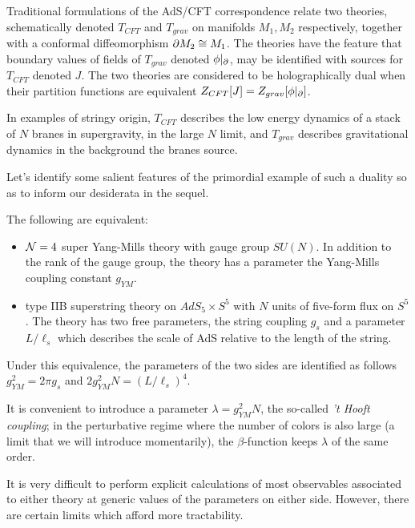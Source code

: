 Traditional formulations of the AdS/CFT correspondence relate two theories, schematically denoted $T_{CFT}$ and $T_{grav}$ on manifolds $M_{1}, M_{2}$ respectively, together with a conformal diffeomorphism $\partial M_{2}\cong M_{1}$. The theories have the feature that boundary values of fields of $T_{grav}$ denoted $\phi |_{\partial}$, may be identified with sources for $T_{CFT}$ denoted $J$. The two theories are considered to be holographically dual when their partition functions are equivalent $Z_{CFT}[J] = Z_{grav}[\phi |_{\partial}]$. 

In examples of stringy origin, $T_{CFT}$ describes the low energy dynamics of a stack of $N$ branes in supergravity, in the large $N$ limit, and $T_{grav}$ describes gravitational dynamics in the background the branes source. 

\parsec[]
Let's identify some salient features of the primordial example of such a duality so as to inform our desiderata in the sequel.

\begin{conj}
The following are equivalent:
\begin{itemize}
\item $\mathcal{N}=4$ super Yang-Mills theory with gauge group $SU(N)$. In addition to the rank of the gauge group, the theory has a parameter the Yang-Mills coupling constant $g_{YM}$.
\item type IIB superstring theory on $AdS_5\times S^5$ with $N$ units of five-form flux on $S^5$. The theory has two free parameters, the string coupling $g_s$ and a parameter $L/\ell_s$ which describes the scale of AdS relative to the length of the string. \end{itemize}

Under this equivalence, the parameters of the two sides are identified as follows $g_{YM}^2 = 2\pi g_s$ and $2g_{YM}^2N = (L/\ell_s)^4$. 
\end{conj}

It is convenient to introduce a parameter $\lambda = g^2_{YM} N$, the so-called \textit{'t Hooft coupling}; in the perturbative regime where the number of colors is also large (a limit that we will introduce momentarily), the $\beta$-function keeps $\lambda$ of the same order.

It is very difficult to perform explicit calculations of most observables associated to either theory at generic values of the parameters on either side. However, there are certain limits which afford more tractability. 

